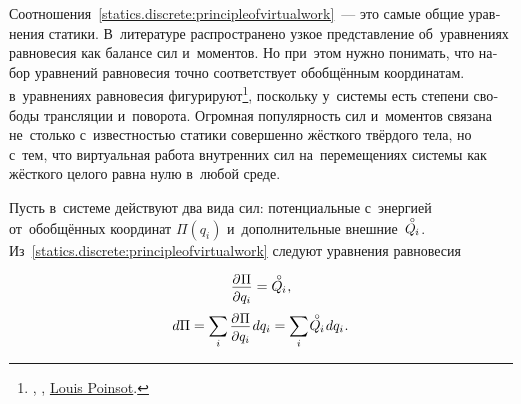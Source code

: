 \begin{otherlanguage}{russian}
Соотношения~\eqref{statics.discrete:principleofvirtualwork}~--- это самые общие уравнения статики. В~литературе распространено узкое представление об~уравнениях равновесия как балансе сил и~моментов. Но при~этом нужно понимать, что набор уравнений равновесия точно соответствует обобщённым координатам.
~
в~уравнениях равновесия фигурируют\footnote{, ,    
\href{https://gallica.bnf.fr/ark:/12148/bpt6k6213152z.texteImage}{}
\href{https://en.wikipedia.org/wiki/Louis_Poinsot}{Louis Poinsot}.}\hspace{-1ex},
поскольку у~системы есть степени свободы трансляции и~поворота. Огромная популярность сил и~моментов связана не~столько с~известностью статики совершенно жёсткого твёрдого тела, но с~тем, что виртуальная работа внутренних сил на~перемещениях системы как жёсткого целого равна нулю в~любой среде.

Пусть в~системе действуют два вида сил: потенциальные с~энергией от~обобщённых координат ${\Pi(q_i)}$ и~дополнительные внешние~${\mathcircabove{Q}_{\hspace{-0.1ex}i}}$. Из~\eqref{statics.discrete:principleofvirtualwork} следуют уравнения равновесия

\nopagebreak\vspace{-0.1em}\begin{equation}\label{staticequilibriumwithpotentialenergy}
\scalebox{0.96}{$ \displaystyle \frac{\raisemath{-0.15em}{\partial \hspace{.1ex} \Pi}}{\raisemath{-0.1em}{\partial q_i}} $} = \mathcircabove{Q}_{\hspace{-0.1ex}i}
\hspace{.1ex},
\end{equation}
\nopagebreak\vspace{.1em}\begin{equation*}
d\Pi = \scalebox{0.95}[1]{$\displaystyle \sum_{\smash{i}}$} \hspace{.32ex}
\scalebox{0.96}{$ \displaystyle \frac{\raisemath{-0.15em}{\partial \hspace{.1ex} \Pi}}{\raisemath{-0.1em}{\partial q_i}} $} \hspace{.2ex} dq_i
= \scalebox{0.95}[1]{$\displaystyle \sum_{\smash{i}}$} \hspace{.2ex} \mathcircabove{Q}_{\hspace{-0.1ex}i} \hspace{.2ex} dq_i
\hspace{.1ex} .
\end{equation*}


\end{otherlanguage}
